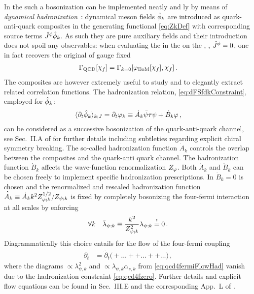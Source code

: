 In the \frg{} such a bosonization can be implemented neatly and \rgscaledependent{}ly by means of \textit{dynamical hadronization}~\cite{Cyrol:2017ewj,Alkofer:2018guy,Fu:2019hdw}:
dynamical meson fields $\hat{\phi}_k$ are introduced as quark-anti-quark composites in the generating functional \eqref{eq:ZkDef} with corresponding source terms $\hat{J}^\phi \hat{\phi}_k$.
As such they are pure auxiliary fields and their introduction does not spoil any \ir{} observables: when evaluating the \eaa{} in the \ir{} on the \qeom{}, \ie{}, $\hat{J}^\phi=0$, one in fact recovers the original \ea{} of gauge fixed \qcd{}
\begin{align}
\Gamma_{\mathrm{QCD}}[\FSsf{}_f]=\Gamma_{k=0}[\MFphi_\eom[\FSsf{}_f],\FSsf{}_f]\,.
\label{eq:qcdAuxEom}
\end{align}
The composites are however extremely useful to study \csb{} and to elegantly extract related correlation functions.
The \rgscaledependent{} hadronization relation, \cf{} \cref{eq:dFSfdkConstraint}, employed for $\hat{\phi}_k$:
\begin{align}
\langle\partial_t \hat{\phi}_k \rangle_{k;{J}}=\partial_t\varphi_k \equiv \dot{A}_k\bar{\psi} \tau \psi + \dot{B}_k\varphi\,, \label{eq:qcdPhiHad}
\end{align}
can be considered as a successive bosonization of the quark-anti-quark channel, see Sec.~II.A of  for further details including subtleties regarding explicit chiral symmetry breaking.
The so-called hadronization function $\dot{A}_k$ controls the overlap between the composites and the quark-anti quark channel.
The hadronization function $\dot{B}_k$ affects the wave-function renormalization $Z_\varphi$.
Both $\dot{A}_k$ and $\dot{B}_k$ can be chosen freely to implement specific hadronization prescriptions. 
In  $\dot{B}_k=0$ is chosen and the renormalized and rescaled hadronization function $\dot{\bar{A}}_k\equiv \dot{A}_k k^2 Z_{\varphi;k}^{1/2}/Z_{\psi;k}$ is fixed by completely bosonizing the four-fermi interaction at all scales by enforcing 
\begin{align}
	\forall k\quad \bar{\lambda}_{\psi;k}\equiv \frac{k^2}{Z_{\psi;k}^2}{\lambda}_{\psi;k} \stackrel{!}{=}0\,.
	\label{eq:qcd4fzero}
\end{align}
Diagrammatically this choice entails for the flow of the four-fermi coupling
\begin{align}
\partial_t &= \tilde{\partial}_t \Bigg(
+\ldots
++\ldots
++\ldots
\Bigg)\,,\label{eq:qcd4fermiFlowHad}
\end{align}
where the diagrams $\propto\lambda_{\psi,k}^2$ and $\propto\lambda_{\psi,k}\alpha_{s,k}$ from \cref{eq:qcd4fermiFlowHad} vanish due to the hadronization constraint \eqref{eq:qcd4fzero}.
Further details and explicit flow equations can be found in Sec.~III.E  and the corresponding App.~L of .

